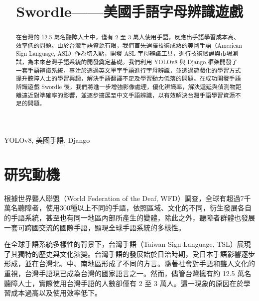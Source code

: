 \documentclass[conference]{IEEEtran}
\begin{document}
\title{Swordle——美國手語字母辨識遊戲}

\author{
}

\maketitle

\begin{abstract}
在台灣的 12.5 萬名聽障人士中，僅有 2 至 3 萬人使用手語，反應出手語學習成本高、效率低的問題。由於台灣手語資源有限，我們首先選擇技術成熟的美國手語（American Sign Language, ASL）作為切入點，開發 ASL 字母辨識工具，進行技術驗證與市場測試，為未來台灣手語系統的開發奠定基礎。我們利用 YOLOv8 與 Django 框架開發了一套手語辨識系統，專注於透過英文單字手語進行字母辨識，並透過遊戲化的學習方式提升聽障人士的學習興趣，解決手語翻譯不足及學習動力低落的問題。在成功開發手語辨識遊戲 Swordle 後，我們將進一步增強影像處理，優化辨識率，解決遞延與偵測物距離遠近對準確率的影響，並逐步擴展至中文手語辨識，以有效解決台灣手語學習資源不足的問題。
\end{abstract}

\begin{IEEEkeywords}
YOLOv8, 美國手語, Django
\end{IEEEkeywords}

\section{研究動機}

根據世界聾人聯盟（World Federation of the Deaf, WFD）調查，全球有超過7千萬名聽障者，使用300種以上不同的手語\cite{nationalgeographic2024sign}，依照區域、文化的不同，衍生發展各自的手語系統，甚至也有同一地區內部所產生的變體，除此之外，聽障者群體也發展一套可跨國交流的國際手語，顯現全球手語系統的多樣性。

在全球手語系統多樣性的背景下，台灣手語（Taiwan Sign Language, TSL）展現了其獨特的歷史與文化演變。台灣手語的發展始於日治時期，受日本手語影響逐步形成，並在台灣北、中、南地區形成了不同的方言。隨著社會對手語和聾人文化的重視，台灣手語現已成為台灣的國家語言之一。然而，儘管台灣擁有約 12.5 萬名聽障人士，實際使用台灣手語的人數卻僅有 2 至 3 萬人\cite{yahoo2020news}。這一現象的原因在於學習成本過高以及使用效率低下。
\end{document}
